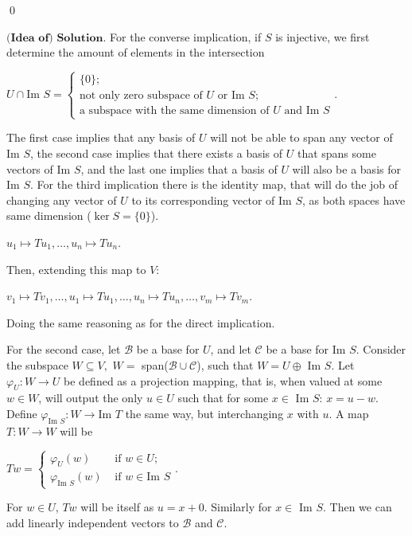 \documentclass{article}
\theoremstyle{remark}
\begin{document}
\begin{enumerate}
        \begin{flushright}
            \qed
        \end{flushright}

        $\textbf{(Idea of) Solution.}$
        For the converse implication, if $S$ is injective, we first determine the amount of elements in the intersection
        \begin{center}
            $U \cap \text{Im }S =
            \begin{cases}
                \{0\};\\
                \text{not only zero subspace of } U \text{ or Im }S;\\
                \text{a subspace with the same dimension of }U \text{ and Im }S
            \end{cases}$.
        \end{center}
        The first case implies that any basis of $U$ will not be able to span any vector of Im $S$,
        the second case implies that there exists a basis of $U$ that spans some vectors of Im $S$,
        and the last one implies that a basis of $U$ will also be a basis for Im $S$.
        For the third implication there is the identity map, that will do the job of changing any vector of $U$ to its corresponding
        vector of Im $S$, as both spaces have same dimension ($\ker S = \{0\}$).
        \begin{center}
            $u_1 \mapsto Tu_1, \dots, u_n \mapsto Tu_n$.
        \end{center}
        Then, extending this map to $V$:
        \begin{center}
            $v_1 \mapsto Tv_1, \dots, u_1 \mapsto Tu_1, \dots, u_n \mapsto Tu_n,\dots, v_m \mapsto Tv_m$.
        \end{center}
        Doing the same reasoning as for the direct implication.

        For the second case, let $\mathcal{B}$ be a base for $U$, and let $\mathcal{C}$ be a base for Im $S$.
        Consider the subspace $W \subseteq V,$ $W=$ span($\mathcal{B}\cup \mathcal{C}$),
        such that $W = U \oplus$ Im $S$. Let $\varphi_U: W \to U$ be defined as a projection mapping, that is, when
        valued at some $w \in W$, will output the only $u \in U$ such that for some $x\in$ Im $S$:
        $x = u - w$.
        Define $\varphi_{\text{Im }S}: W \to \text{Im }T$ the same way, but interchanging $x$ with $u$.
        A map $T: W \to W$ will be
        \begin{center}
            $Tw = \begin{cases}
                \varphi_U(w) & \text{ if } w\in U;\\
                \varphi_{\text{Im }S }(w) & \text{ if } w\in \text{Im }S
            \end{cases}$.
        \end{center}
        For $w\in U$, $Tw$ will be itself as $u = x + 0$. Similarly for $x \in$ Im $S$.
        Then we can add linearly independent vectors to $\mathcal{B}$ and $\mathcal{C}$.


\end{enumerate}
\end{document}
